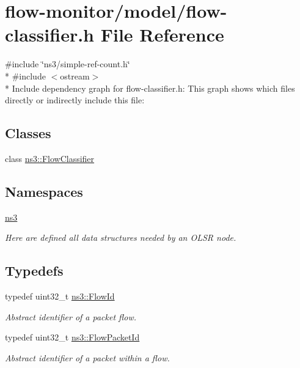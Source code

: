 \hypertarget{flow-classifier_8h}{}\section{flow-\/monitor/model/flow-\/classifier.h File Reference}
\label{flow-classifier_8h}
{\ttfamily \#include \char`\"{}ns3/simple-\/ref-\/count.\+h\char`\"{}}\\*
{\ttfamily \#include $<$ostream$>$}\\*
Include dependency graph for flow-\/classifier.h\+:
This graph shows which files directly or indirectly include this file\+:
\subsection*{Classes}
\begin{DoxyCompactItemize}
\item 
class \hyperlink{classns3_1_1FlowClassifier}{ns3\+::\+Flow\+Classifier}
\end{DoxyCompactItemize}
\subsection*{Namespaces}
\begin{DoxyCompactItemize}
\item 
 \hyperlink{namespacens3}{ns3}
\begin{DoxyCompactList}\small\item\em Here are defined all data structures needed by an O\+L\+SR node. \end{DoxyCompactList}\end{DoxyCompactItemize}
\subsection*{Typedefs}
\begin{DoxyCompactItemize}
\item 
typedef uint32\+\_\+t \hyperlink{group__flow-monitor_ga39a766c4a370cdb9ab8ac85da4b288e9}{ns3\+::\+Flow\+Id}
\begin{DoxyCompactList}\small\item\em Abstract identifier of a packet flow. \end{DoxyCompactList}\item 
typedef uint32\+\_\+t \hyperlink{group__flow-monitor_gaa1cb18250e1672975204f1254b8aa2ae}{ns3\+::\+Flow\+Packet\+Id}
\begin{DoxyCompactList}\small\item\em Abstract identifier of a packet within a flow. \end{DoxyCompactList}\end{DoxyCompactItemize}
